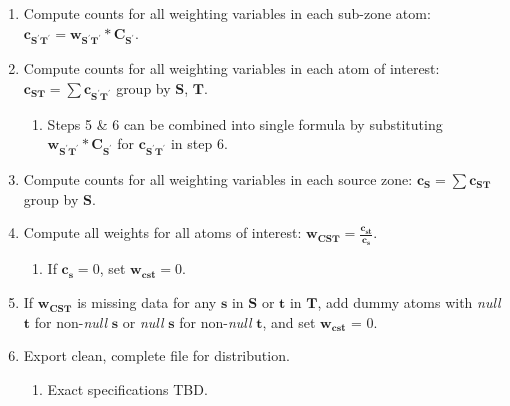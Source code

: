 \documentclass{article}
\begin{document}
\begin{enumerate}
\begin{enumerate}
\begin{enumerate}
      \end{enumerate}
   \end{enumerate}
\item Compute counts for all weighting variables in each sub-zone atom: $\bm{c_{\mathbf{S^\prime T^\prime}}} = \bm{w_{\mathbf{S^\prime T^\prime}}} * \bm{C_{\mathbf{S^\prime}}}$.
\item Compute counts for all weighting variables in each atom of interest: $\bm{c_{\mathbf{ST}}} = \sum \bm{c_{\mathbf{S^\prime T^\prime}}}$ group by $\mathbf{S}$, $\mathbf{T}$.
  \begin{enumerate}
  \item Steps 5 \& 6 can be combined into single formula by substituting $\bm{w_{\mathbf{S^\prime T^\prime}}} * \bm{C_{\mathbf{S^\prime}}}$ for $\bm{c_{\mathbf{S^\prime T^\prime}}}$ in step 6.
  \end{enumerate}
\item Compute counts for all weighting variables in each source zone: $\bm{c_{\mathbf{S}}} = \sum \bm{c_{\mathbf{ST}}}$ group by $\mathbf{S}$.
\item Compute all weights for all atoms of interest: $\bm{w_{\mathbf{CST}}} = \displaystyle \frac{\bm{c_{st}}}{\bm{c_{s}}}$.
  \begin{enumerate}
  \item If $\bm{c_{s}} = 0$, set $\bm{w_{\mathbf{cst}}} = 0$.
  \end{enumerate}
\item If $\bm{w_{\mathbf{CST}}}$ is missing data for any $\bm{s}$ in $\mathbf{S}$ or $\bm{t}$ in $\mathbf{T}$, add dummy atoms with \textit{null} $\bm{t}$ for non-\textit{null} $\bm{s}$ or \textit{null} $\bm{s}$ for non-\textit{null} $\bm{t}$, and set $\bm{w_{\mathbf{cst}}}$ = 0.

\item Export clean, complete file for distribution.
  \begin{enumerate}
  \item Exact specifications TBD.
  \end{enumerate}
\end{enumerate}
\end{document}
